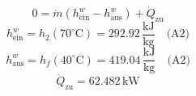 

\item[a)] 
    \[
    0 = \dot{m} \left( h_{\text{ein}}^{w} - h_{\text{aus}}^{w} \right) + \dot{Q}_{\text{zu}}
    \]
    \[
    h_{\text{ein}}^{w} = h_{2} (70^\circ \text{C}) = 292.92 \, \frac{\text{kJ}}{\text{kg}} \quad \text{(A2)}
    \]
    \[
    h_{\text{aus}}^{w} = h_{f} (40^\circ \text{C}) = 419.04 \, \frac{\text{kJ}}{\text{kg}} \quad \text{(A2)}
    \]
    \[
    \dot{Q}_{\text{zu}} = \boxed{62.482 \, \text{kW}}
    \]